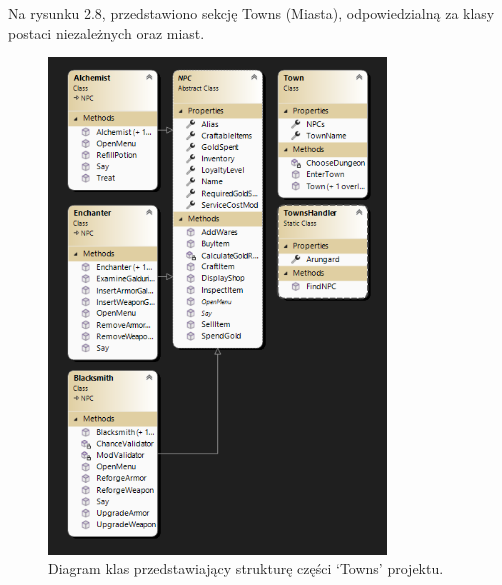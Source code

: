 \begin{itemize}
    \begin{minipage}{\linewidth}%
    \item Na rysunku 2.8, przedstawiono sekcję Towns (Miasta), odpowiedzialną za klasy postaci niezależnych oraz miast.
        \begin{figure}[H]
        \centering
        \includegraphics[width=0.8\textwidth]{figures/class_diagram_towns.png}
        \caption{Diagram klas przedstawiający strukturę części `Towns' projektu.}
        \label{fig:class_diagram_towns}
        \end{figure}
    \end{minipage}


\end{itemize}
